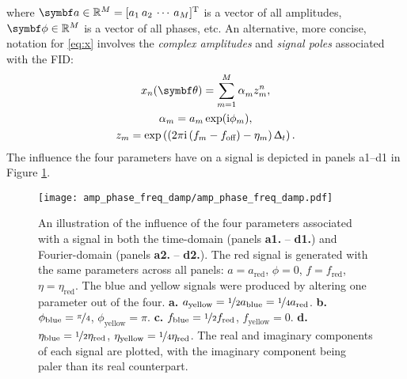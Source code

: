 where $\bda \in \mathbb{R}^M = [a_1 \hspace{2pt} a_2 \hspace{2pt} \cdots
\hspace{2pt} a_M]^{\mathrm{T}}$ is a vector of all amplitudes, $\bdphi \in
\mathbb{R}^M$ is a vector of all phases, etc.
An alternative, more concise, notation for \eqref{eq:x}
involves the \emph{complex amplitudes} and \emph{signal poles} associated with
the \ac{FID}:
\begin{subequations}
    \begin{gather}
        x_n(\bth) = \sumM \alpha_m^{\vphantom{n}} z_m^n,\\
        \alpha_m = \amexpphim,\\
        z_m = \exp\left(
            \left(2 \pi \iu \left(f_m - \foff\right) - \eta_m\right) \Dt
        \right).\label{eq:signal-pole}
    \end{gather}
    \label{eq:x-alpha-z}
\end{subequations}
The influence the four parameters have on a signal is depicted in panels
a1--d1 in Figure \ref{fig:amp-phase-freq-damp}.
\begin{figure}
    \centering
    \texttt{[image: amp\_phase\_freq\_damp/amp\_phase\_freq\_damp.pdf]}
    \caption[
        An illustration of the influence of the four parameters associated
        with a signal in both the time-domain nels and Fourier-domain.
    ]{
        An illustration of the influence of the four parameters associated
        with a signal in both the time-domain (panels \textbf{a1.} --
        \textbf{d1.}) and Fourier-domain (panels \textbf{a2.} -- \textbf{d2.}).
        The red signal is generated with the same parameters across all panels:
        $a = a_{\text{red}}$, $\phi = 0$, $f = f_{\text{red}}$,  $\eta =
        \eta_{\text{red}}$.  The blue and yellow signals were produced by
        altering one parameter out of the four.
        \textbf{a.} $a_{\text{yellow}} = \nicefrac{1}{2} a_{\text{blue}} =
        \nicefrac{1}{4} a_{\text{red}}$.
        \textbf{b.}
        $\phi_{\text{blue}} = \nicefrac{\pi}{4}$,
        $\phi_{\text{yellow}} = \pi$.
        \textbf{c.}
        $f_{\text{blue}} = \nicefrac{1}{2} f_{\text{red}}$,
        $f_{\text{yellow}} = 0$.
        \textbf{d.}
        $\eta_{\text{blue}} = \nicefrac{1}{2}\eta_{\text{red}}$,
        $\eta_{\text{yellow}} = \nicefrac{1}{4}\eta_{\text{red}}$.
        The real and imaginary components of each signal are plotted, with the
        imaginary component being paler than its real counterpart.
    }
    \label{fig:amp-phase-freq-damp}
\end{figure}

